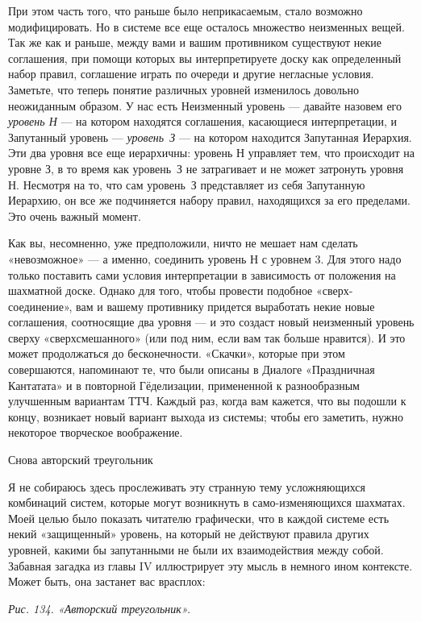 \documentclass[../main.tex]{subfiles}
\begin{document}
При этом часть того, что раньше было неприкасаемым, стало возможно модифицировать. Но в системе все еще осталось множество неизменных вещей. Так же как и раньше, между вами и вашим противником существуют некие соглашения, при помощи которых вы интерпретируете доску как определенный набор правил, соглашение играть по очереди и другие негласные условия. Заметьте, что теперь понятие различных уровней изменилось довольно неожиданным образом. У нас есть Неизменный уровень --- давайте назовем его \emph{уровень Н} --- на котором находятся соглашения, касающиеся интерпретации, и Запутанный уровень --- \emph{уровень~З} --- на котором находится Запутанная Иерархия. Эти два уровня все еще иерархичны: уровень Н управляет тем, что происходит на уровне З, в то время как уровень~З не затрагивает и не может затронуть уровня Н. Несмотря на то, что сам уровень~З представляет из себя Запутанную Иерархию, он все же подчиняется набору правил, находящихся за его пределами. Это очень важный момент.

Как вы, несомненно, уже предположили, ничто не мешает нам сделать «невозможное» --- а именно, соединить уровень Н с уровнем 3. Для этого надо только поставить сами условия интерпретации в зависимость от положения на шахматной доске. Однако для того, чтобы провести подобное «сверх-соединение», вам и вашему противнику придется выработать некие новые соглашения, соотносящие два уровня --- и это создаст новый неизменный уровень сверху «сверхсмешанного» (или под ним, если вам так больше нравится). И это может продолжаться до бесконечности. «Скачки», которые при этом совершаются, напоминают те, что были описаны в Диалоге «Праздничная Кантатата» и в повторной Гёделизации, примененной к разнообразным улучшенным вариантам ТТЧ. Каждый раз, когда вам кажется, что вы подошли к концу, возникает новый вариант выхода из системы; чтобы его заметить, нужно некоторое творческое воображение.

Снова авторский треугольник

Я не собираюсь здесь прослеживать эту странную тему усложняющихся комбинаций систем, которые могут возникнуть в само-изменяющихся шахматах. Моей целью было показать читателю графически, что в каждой системе есть некий «защищенный» уровень, на который не действуют правила других уровней, какими бы запутанными не были их взаимодействия между собой. Забавная загадка из главы IV иллюстрирует эту мысль в немного ином контексте. Может быть, она застанет вас врасплох:

\emph{Рис. 134. «Авторский треугольник».}
\end{document}
